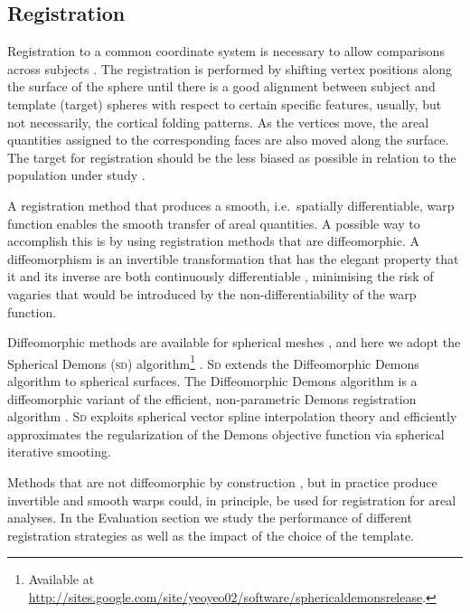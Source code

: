 \subsection{Registration}

Registration to a common coordinate system is necessary to allow comparisons across subjects \citep{Drury1996}. The registration is performed by shifting vertex positions along the surface of the sphere until there is a good alignment between subject and template (target) spheres with respect to certain specific features, usually, but not necessarily, the cortical folding patterns. As the vertices move, the areal quantities assigned to the corresponding faces are also moved along the surface. The target for registration should be the less biased as possible in relation to the population under study \citep{Thompson2002}.

A registration method that produces a smooth, i.e.\ spatially differentiable, warp function enables the smooth transfer of areal quantities. A possible way to accomplish this is by using registration methods that are diffeomorphic. A diffeomorphism is an invertible transformation that has the elegant property that it and its inverse are both continuously differentiable \citep{Christensen1996, Miller1997}, minimising the risk of vagaries that would be introduced by the non-differentiability of the warp function.

Diffeomorphic methods are available for spherical meshes \citep{Glaunes2004, Yeo2010, Robinson2014}, and here we adopt the Spherical Demons (\textsc{sd}) algorithm\footnote{Available at \href{http://sites.google.com/site/yeoyeo02/software/sphericaldemonsrelease}{http://sites.google.com/site/yeoyeo02/software/sphericaldemonsrelease}.} \citep{Yeo2010}. \textsc{Sd} extends the Diffeomorphic Demons algorithm \citep{Vercauteren2009} to spherical surfaces. The Diffeomorphic Demons algorithm is a diffeomorphic variant of the efficient, non-parametric Demons registration algorithm \citep{Thirion1998}. \textsc{Sd} exploits spherical vector spline interpolation theory and efficiently approximates the regularization of the Demons objective function via spherical iterative smooting.

Methods that are not diffeomorphic by construction \citep{Fischl1999_intersubject, Auzias2013}, but in practice produce invertible and smooth warps could, in principle, be used for registration for areal analyses. In the Evaluation section we study the performance of different registration strategies as well as the impact of the choice of the template.

